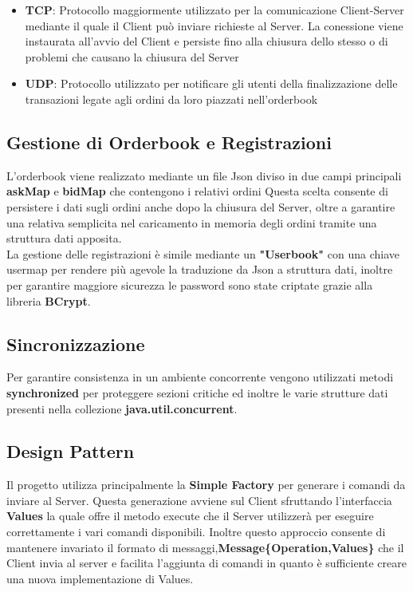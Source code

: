 \documentclass{article}
\begin{document}
\begin{itemize}
    \item \textbf{TCP}: Protocollo maggiormente utilizzato per la comunicazione Client-Server mediante il quale il Client può inviare richieste al Server. La conessione viene instaurata all'avvio del Client e persiste fino alla chiusura dello stesso o di problemi che causano la chiusura del Server
    \item \textbf{UDP}: Protocollo utilizzato per notificare gli utenti della finalizzazione delle transazioni legate agli ordini da loro piazzati nell'orderbook
\end{itemize}

\subsection{Gestione di Orderbook e Registrazioni}
L'orderbook viene realizzato mediante un file Json diviso in due campi principali \textbf{askMap} e \textbf{bidMap} che contengono i relativi ordini
Questa scelta consente di persistere i dati sugli ordini anche dopo la chiusura del Server, oltre a garantire una relativa semplicita nel caricamento in memoria degli ordini tramite una struttura dati apposita.
\\La gestione delle registrazioni è simile mediante un \textbf{"Userbook"} con una chiave usermap per rendere più agevole la traduzione da Json a struttura dati, inoltre per garantire maggiore sicurezza le password sono state criptate grazie alla libreria \textbf{BCrypt}.

\subsection{Sincronizzazione}
Per garantire consistenza in un ambiente concorrente vengono utilizzati metodi \textbf{synchronized} per proteggere sezioni critiche ed inoltre le varie strutture dati presenti nella collezione \textbf{java.util.concurrent}.

\subsection{Design Pattern}
Il progetto utilizza principalmente la \textbf{Simple Factory} per generare i comandi da inviare al Server.
Questa generazione avviene sul Client sfruttando l'interfaccia \textbf{Values} la quale offre il metodo execute che il Server utilizzerà per eseguire correttamente i vari comandi disponibili. Inoltre questo approccio consente di mantenere invariato il formato di messaggi,\textbf{Message\{Operation,Values\}} che il Client invia al server e facilita l'aggiunta di comandi in quanto è sufficiente creare una nuova implementazione di Values.
\end{document}
